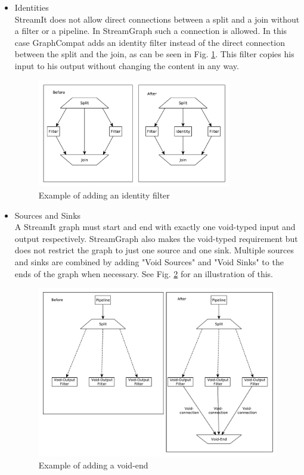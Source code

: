 \documentclass[journal]{IEEEtran}
\begin{document}
\begin{itemize}
\item Identities\\
  StreamIt does not allow direct connections between a split and a join without
  a filter or a pipeline. In StreamGraph such a connection is allowed. In this
  case GraphCompat adds an identity filter instead of the direct connection
  between the split and the join, as can be seen in Fig.
  \ref{fig_split_join_identity}. This filter copies his input to his output
  without changing the content in any way.\\

\begin{figure}[h]
	\centering
	\includegraphics[width=0.8\textwidth]{SplitJoinIdentity}
	\caption{Example of adding an identity filter}
	\label{fig_split_join_identity}
\end{figure}

\item Sources and Sinks\\
  A StreamIt graph must start and end with exactly one void-typed input and
  output respectively. StreamGraph also makes the void-typed requirement but
  does not restrict the graph to just one source and one sink. Multiple sources
  and sinks are combined by adding "Void Sources" and "Void Sinks" to the ends
  of the graph when necessary. See Fig. \ref{fig_void_end} for an illustration
  of this.\\

\begin{figure}[h]
	\centering
	\includegraphics[width=\textwidth]{VoidEnd}
	\caption{Example of adding a void-end}
	\label{fig_void_end}
\end{figure}


\end{itemize}
\end{document}
